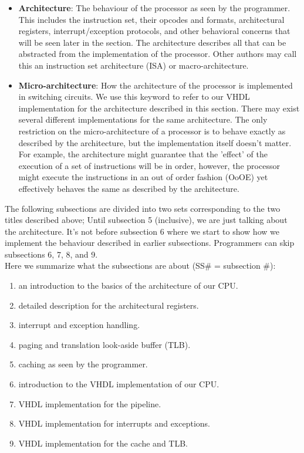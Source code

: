 \documentclass[]{scrartcl}
\begin{document}
\begin{itemize}

\item \textbf{Architecture}:
      The behaviour of the processor as seen by the programmer.
      This includes the instruction set, their opcodes and formats,
      architectural registers, interrupt/exception protocols, and other
      behavioral concerns that will be seen later in the section.
      The architecture describes all that can be abstracted from the
      implementation of the processor. Other authors may call this an
      instruction set architecture (ISA) or macro-architecture.

\item \textbf{Micro-architecture}:
      How the architecture of the processor is implemented
      in switching circuits. We use this keyword to refer to our VHDL
      implementation for the architecture described in this section. There
      may exist several different implementations for the same architecture.
      The only restriction on the micro-architecture of a processor is to
      behave exactly as described by the architecture, but the implementation
      itself doesn't matter. For example, the architecture might guarantee
      that the 'effect' of the execution of a set of instructions will be
      in order, however, the processor might execute the instructions in an
      out of order fashion (OoOE) yet effectively behaves the same as
      described by the architecture.

\end{itemize}

The following subsections are divided into two sets corresponding to
the two titles described above; Until subsection 5 (inclusive), we are just
talking about the architecture. It's not before subsection 6 where we
start to show how we implement the behaviour described in earlier
subsections. Programmers can skip subsections 6, 7, 8, and 9.\\

Here we summarize what the subsections are about (SS\# = subsection \#):

\begin{enumerate}[label=SS\arabic*.]

\item an introduction to the basics of the architecture of our CPU.
\item detailed description for the architectural registers.
\item interrupt and exception handling.
\item paging and translation look-aside buffer (TLB).
\item caching as seen by the programmer.
\item introduction to the VHDL implementation of our CPU.
\item VHDL implementation for the pipeline.
\item VHDL implementation for interrupts and exceptions.
\item VHDL implementation for the cache and TLB.

\end{enumerate}
\end{document}
